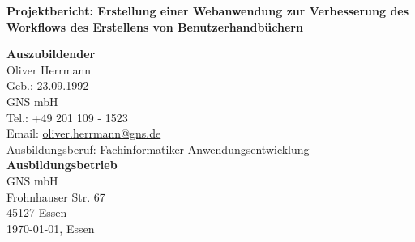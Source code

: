 \newcommand{\Projekt}{Erstellung einer Webanwendung
		zur Verbesserung des Workflows des Erstellens von Benutzerhandbüchern}

\thispagestyle{empty}

\begin{center}
	\huge \bfseries
	Projektbericht: \Projekt \\[4cm]

	\Large	\mdseries

	\textbf{Auszubildender} \\
	Oliver Herrmann \\
	Geb.: 23.09.1992 \\
	GNS mbH \\
	Tel.: +49 201 109 - 1523 \\
	Email: \href{mailto:oliver.herrmann@gns.de}{oliver.herrmann@gns.de}  \\
	Ausbildungsberuf: Fachinformatiker Anwendungsentwicklung \\[2cm]

	\textbf{Ausbildungsbetrieb} \\
	GNS mbH \\
	Frohnhauser Str. 67 \\
	45127 Essen \\[3cm]

	\today, Essen
\end{center}


